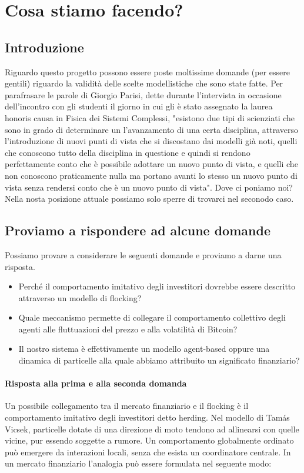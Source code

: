 \section{Cosa stiamo facendo?}
\subsection{Introduzione}
Riguardo questo progetto possono essere poste moltissime domande (per essere gentili) riguardo la validità delle scelte modellistiche che sono state 
fatte. Per parafrasare le parole di Giorgio Parisi, dette durante l'intervista in occasione dell'incontro con gli studenti il giorno in cui gli è stato 
assegnato la laurea honoris causa in Fisica dei Sistemi Complessi, "esistono due tipi di scienziati che sono in grado di determinare un 
l'avanzamento di una certa disciplina, attraverso l'introduzione di nuovi punti di vista che si discostano dai modelli già noti, quelli che conoscono 
tutto della disciplina in questione e quindi si rendono perfettamente conto che è possibile adottare un nuovo punto di vista, e quelli che non conoscono praticamente 
nulla ma portano avanti lo stesso un nuovo punto di vista senza rendersi conto che è un nuovo punto di vista". Dove ci poniamo noi? Nella nosta 
posizione attuale possiamo solo sperre di trovarci nel seconodo caso. 

\subsection{Proviamo a rispondere ad alcune domande}
Possiamo provare a considerare le seguenti domande e proviamo a darne una risposta.
\begin{itemize}
    \item Perché il comportamento imitativo degli investitori dovrebbe essere descritto attraverso un modello di flocking?
    \item Quale meccanismo permette di collegare il comportamento collettivo degli agenti alle fluttuazioni del prezzo e alla volatilità di Bitcoin?
    \item Il nostro sistema è effettivamente un modello agent-based oppure una dinamica di particelle alla quale abbiamo attribuito un significato finanziario?
\end{itemize}

\paragraph{Risposta alla prima e alla seconda domanda}
Un possibile collegamento tra il mercato finanziario e il flocking è il comportamento imitativo degli investitori detto herding.
Nel modello di Tamás Vicsek, particelle dotate di una direzione di moto tendono ad allinearsi con quelle vicine, pur essendo soggette a rumore. 
Un comportamento globalmente ordinato può emergere da interazioni locali, senza che esista un coordinatore centrale.
In un mercato finanziario l'analogia può essere formulata nel seguente modo:

